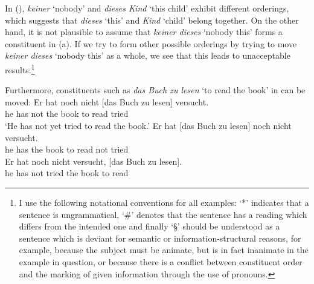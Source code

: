 In (), \emph{keiner} `nobody' and \emph{dieses Kind} `this child' exhibit different orderings,
which suggests that \emph{dieses} `this' and \emph{Kind} `child' belong together.
\eal
{}
\zl
On the other hand, it is not plausible to assume that \emph{keiner dieses} `nobody this' forms a constituent in (a). If we try to form other possible orderings by trying
to move \emph{keiner dieses} `nobody this' as a whole, we see that this leads to unacceptable results:\footnote{%
 I use the following notational conventions for all examples: `*'\is{*} indicates that a sentence is ungrammatical, `\#'\is{\#} denotes that the sentence has a reading which
 differs from the intended one and finally  `\S'\is{\S} should be understood as a sentence which is deviant for semantic or information-structural reasons, for example, because
 the subject must be animate, but is in fact inanimate in the example in question, or because there is a conflict between constituent order and the marking of given information through
 the use of pronouns.%
 }
 \eal
{}
\zl

\noindent
Furthermore, constituents such as \emph{das Buch zu lesen} `to read the book' in  can be moved:
\eal
\ex 
\gll Er hat noch nicht [das Buch zu lesen] versucht.\\
     he has \particle{} not \spacebr{}the book to read tried\\
\glt `He has not yet tried to read the book.'
\ex 
\gll Er hat [das          Buch zu lesen] noch   nicht versucht.\\
     he has \spacebr{}the book to read  \particle{} not   tried\\
\ex 
\gll Er hat noch nicht versucht, [das Buch zu lesen].\\
     he has \particle{} not tried    \spacebr{}the book to read\\
\zl
{}

